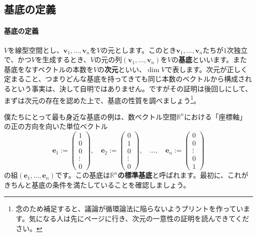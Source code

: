 \subsection{基底の定義} \label{subsec:basis}

\paragraph{基底の定義}

$V$を線型空間とし、$\bm{v}_1, \ldots, \bm{v}_n$を$V$の元とします。このとき$\bm{v}_1,\ldots,\bm{v}_n$たちが$1$次独立で、かつ$V$を生成するとき、$V$の元の列$(\bm{v}_1,\ldots,\bm{v}_n)$を$V$の\textbf{基底}といいます。また基底をなすベクトルの本数を$V$の\textbf{次元}といい、$\dim V$で表します。次元が正しく定まること、つまりどんな基底を持ってきても同じ本数のベクトルから構成されるという事実は、決して自明ではありません。ですがその証明は後回しにして、まずは次元の存在を認めた上で、基底の性質を調べましょう\footnote{念のため補足すると、議論が循環論法に陥らないようプリントを作っています。気になる人は先に\pageref{subsec:uniqueness_of_dimension}ページに行き、次元の一意性の証明を読んできてください。}。

僕たちにとって最も身近な基底の例は、数ベクトル空間$\mathbb{R}^n$における「座標軸」の正の方向を向いた単位ベクトル
\[
\bm{e}_1 :=
\begin{pmatrix}
1 \\
0 \\
0 \\
\vdots \\
0
\end{pmatrix}, \quad
\bm{e}_2 :=
\begin{pmatrix}
0 \\
1 \\
0 \\
\vdots \\
0
\end{pmatrix}, \quad \ldots, \quad
\bm{e}_n :=
\begin{pmatrix}
0 \\
0 \\
\vdots \\
0 \\
1
\end{pmatrix}
\]
の組$(\bm{e}_1, \ldots, \bm{e}_n)$です。この基底は\textbf{$\mathbb{R}^n$の標準基底}と呼ばれます。最初に、これがきちんと基底の条件を満たしていることを確認しましょう。

